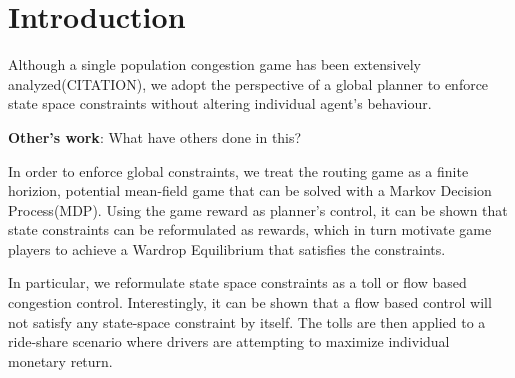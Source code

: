 \section{Introduction}
\cite{altman1999constrained}
Although a single population congestion game has been extensively analyzed(CITATION), we adopt the perspective of a global planner to enforce state space constraints without altering individual agent's behaviour. \newline

\textbf{Other's work}: What have others done in this? \newline

In order to enforce global constraints, we treat the routing game as a finite horizion, potential mean-field game that can be solved with a Markov Decision Process(MDP). Using the game reward as planner's control, it can be shown that state constraints can be reformulated as rewards, which in turn motivate game players to achieve a Wardrop Equilibrium that satisfies the constraints. 

In particular, we reformulate state space constraints as a toll or flow based congestion control. Interestingly, it can be shown that a flow based control will not satisfy any state-space constraint by itself. The tolls are then applied to a ride-share scenario where drivers are attempting to maximize individual monetary return.
